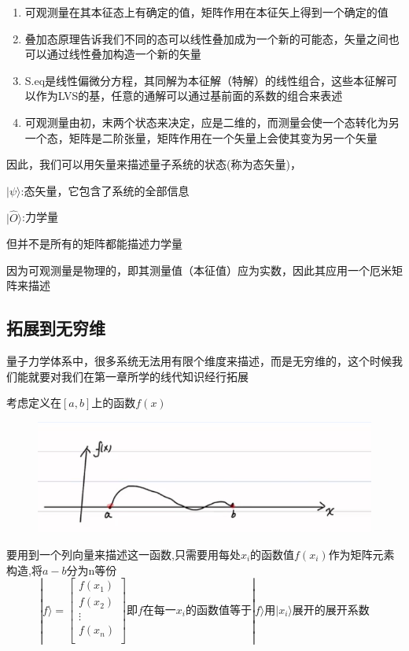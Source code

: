\documentclass[lang=cn,10pt]{elegantbook}
\begin{document}
\begin{enumerate}
	\item 可观测量在其本征态上有确定的值，矩阵作用在本征矢上得到一个确定的值
	\item 叠加态原理告诉我们不同的态可以线性叠加成为一个新的可能态，矢量之间也可以通过线性叠加构造一个新的矢量
	\item S.eq是线性偏微分方程，其同解为本征解（特解）的线性组合，这些本征解可以作为LVS的基，任意的通解可以通过基前面的系数的组合来表述
	\item 可观测量由初，末两个状态来决定，应是二维的，而测量会使一个态转化为另一个态，矩阵是二阶张量，矩阵作用在一个矢量上会使其变为另一个矢量
\end{enumerate}
因此，我们可以用矢量来描述量子系统的状态(称为态矢量)，

$|\psi \rangle $:态矢量，它包含了系统的全部信息

$|\hat{O} \rangle $:力学量

但并不是所有的矩阵都能描述力学量

因为可观测量是物理的，即其测量值（本征值）应为实数，因此其应用一个厄米矩阵来描述
\subsection{拓展到无穷维}

量子力学体系中，很多系统无法用有限个维度来描述，而是无穷维的，这个时候我们能就要对我们在第一章所学的线代知识经行拓展

考虑定义在$[a,b]$上的函数$f(x)$
\begin{figure}[H]
	\centering
	\includegraphics[width=0.7\linewidth]{figure/screenshot0017}
\end{figure}


要用到一个列向量来描述这一函数,只需要用每处$x_i$的函数值$f(x_i)$作为矩阵元素构造,将$a-b$分为n等份
\begin{equation*}
	|f\rangle =\left[ \begin{array}{c}
		f\left( x_1 \right)\\
		f\left( x_2 \right)\\
		\vdots\\
		f\left( x_n \right)\\
	\end{array} \right] \text{即}f\text{在每一}x_i\text{的函数值等于}|f\rangle \text{用}|x_i\rangle \text{展开的展开系数}
\end{equation*}
\end{document}

